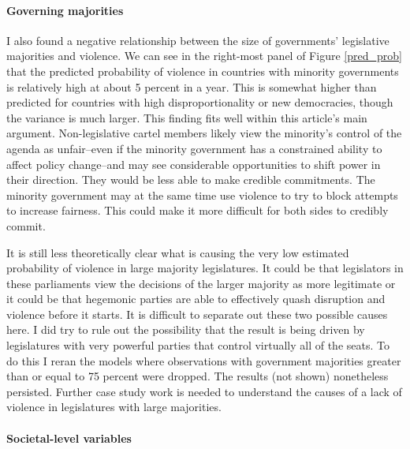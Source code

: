 \documentclass[a4paper]{article}\usepackage[]{graphicx}\usepackage[]{color}
\begin{document}
\paragraph{Governing majorities}

I also found a negative relationship between the size of governments' legislative majorities and violence. We can see in the right-most panel of Figure \ref{pred_prob} that the predicted probability of violence in countries with minority governments is relatively high at about 5 percent in a year. This is somewhat higher than predicted for countries with high disproportionality or new democracies, though the variance is much larger. This finding fits well within this article's main argument. Non-legislative cartel members likely view the minority's control of the agenda as unfair--even if the minority government has a constrained ability to affect policy change--and may see considerable opportunities to shift power in their direction. They would be less able to make credible commitments. The minority government may at the same time use violence to try to block attempts to increase fairness. This could make it more difficult for both sides to credibly commit.

It is still less theoretically clear what is causing the very low estimated probability of violence in large majority legislatures. It could be that legislators in these parliaments view the decisions of the larger majority as more legitimate or it could be that hegemonic parties are able to effectively quash disruption and violence before it starts. It is difficult to separate out these two possible causes here. I did try to rule out the possibility that the result is being driven by legislatures with very powerful parties that control virtually all of the seats. To do this I reran the models where observations with government majorities greater than or equal to 75 percent were dropped. The results (not shown) nonetheless persisted. Further case study work is needed to understand the causes of a lack of violence in legislatures with large majorities.

\paragraph{Societal-level variables}
\end{document}
